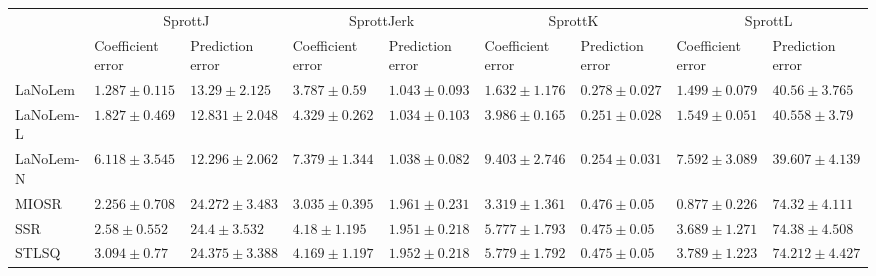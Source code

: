 \begin{table*}
{\begin{tabular}{lllllllll}
 & \multicolumn{2}{c}{SprottJ} & \multicolumn{2}{c}{SprottJerk} & \multicolumn{2}{c}{SprottK} & \multicolumn{2}{c}{SprottL} \\
 & Coefficient error & Prediction error & Coefficient error & Prediction error & Coefficient error & Prediction error & Coefficient error & Prediction error \\
\midrule
LaNoLem & $\mathbf{1.287}\pm 0.115$ & $13.29\pm 2.125$ & $3.787\pm 0.59$ & $1.043\pm 0.093$ & $\mathbf{1.632}\pm 1.176$ & $0.278\pm 0.027$ & $1.499\pm 0.079$ & $40.56\pm 3.765$ \\
LaNoLem-L & $1.827\pm 0.469$ & $12.831\pm 2.048$ & $4.329\pm 0.262$ & $\mathbf{1.034}\pm 0.103$ & $3.986\pm 0.165$ & $\mathbf{0.251}\pm 0.028$ & $1.549\pm 0.051$ & $40.558\pm 3.79$ \\
LaNoLem-N & $6.118\pm 3.545$ & $\mathbf{12.296}\pm 2.062$ & $7.379\pm 1.344$ & $1.038\pm 0.082$ & $9.403\pm 2.746$ & $0.254\pm 0.031$ & $7.592\pm 3.089$ & $\mathbf{39.607}\pm 4.139$ \\
MIOSR & $2.256\pm 0.708$ & $24.272\pm 3.483$ & $\mathbf{3.035}\pm 0.395$ & $1.961\pm 0.231$ & $3.319\pm 1.361$ & $0.476\pm 0.05$ & $\mathbf{0.877}\pm 0.226$ & $74.32\pm 4.111$ \\
SSR & $2.58\pm 0.552$ & $24.4\pm 3.532$ & $4.18\pm 1.195$ & $1.951\pm 0.218$ & $5.777\pm 1.793$ & $0.475\pm 0.05$ & $3.689\pm 1.271$ & $74.38\pm 4.508$ \\
STLSQ & $3.094\pm 0.77$ & $24.375\pm 3.388$ & $4.169\pm 1.197$ & $1.952\pm 0.218$ & $5.779\pm 1.792$ & $0.475\pm 0.05$ & $3.789\pm 1.223$ & $74.212\pm 4.427$ \\

\midrule


\end{tabular}}
\end{table*}
